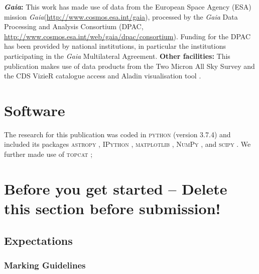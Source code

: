 \documentclass[fleqn,usenatbib]{mnras}
\newcommand{\Gaia}{\textit{Gaia}\xspace} %
\begin{document}
\textbf{\Gaia: } This work has made use of data from the European Space Agency (ESA) mission \Gaia (\url{http://www.cosmos.esa.int/gaia}), processed by the \Gaia Data Processing and Analysis Consortium (DPAC, \url{http://www.cosmos.esa.int/web/gaia/dpac/consortium}). Funding for the DPAC has been provided by national institutions, in particular the institutions participating in the \Gaia Multilateral Agreement. 
\textbf{Other facilities:} This publication makes use of data products from the Two Micron All Sky Survey \citep{Skrutskie2006} and the CDS VizieR catalogue access and Aladin visualisation tool \citep{Vizier2000,Aladin2000}.


\section*{Software}

The research for this publication was coded in \textsc{python} (version 3.7.4) and included its packages
\textsc{astropy} \citep[v. 3.2.2;][]{Robitaille2013,PriceWhelan2018},
\textsc{IPython} \citep[v. 7.8.0;][]{ipython},
\textsc{matplotlib} \citep[v. 3.1.3;][]{matplotlib},
\textsc{NumPy} \citep[v. 1.17.2;][]{numpy}, and
\textsc{scipy} \citep[version 1.3.1;][]{scipy}.
We further made use of \textsc{topcat} \citep[version 4.7;][]{Taylor2005};



\newpage

\appendix

\section{Before you get started -- Delete this section before submission!}

\subsection{Expectations}

\subsubsection{Marking Guidelines}
\end{document}
